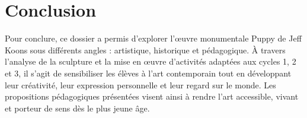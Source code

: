 \documentclass[12pt]{article}
\begin{document}

\section{Conclusion}

Pour conclure, ce dossier a permis d’explorer l’œuvre monumentale Puppy de Jeff Koons sous différents angles : artistique, historique et pédagogique. À travers l’analyse de la sculpture et la mise en œuvre d’activités adaptées aux cycles 1, 2 et 3, il s’agit de sensibiliser les élèves à l’art contemporain tout en développant leur créativité, leur expression personnelle et leur regard sur le monde. Les propositions pédagogiques présentées visent ainsi à rendre l’art accessible, vivant et porteur de sens dès le plus jeune âge.
\end{document}
